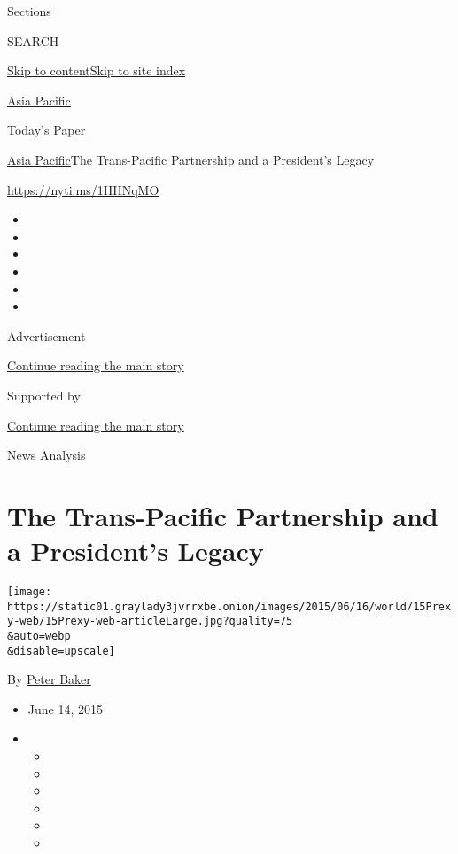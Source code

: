 Sections

SEARCH

\protect\hyperlink{site-content}{Skip to
content}\protect\hyperlink{site-index}{Skip to site index}

\href{https://www.nytimes3xbfgragh.onion/section/world/asia}{Asia
Pacific}

\href{https://myaccount.nytimes3xbfgragh.onion/auth/login?response_type=cookie\&client_id=vi}{}

\href{https://www.nytimes3xbfgragh.onion/section/todayspaper}{Today's
Paper}

\href{/section/world/asia}{Asia Pacific}\textbar{}The Trans-Pacific
Partnership and a President's Legacy

\url{https://nyti.ms/1HHNqMO}

\begin{itemize}
\item
\item
\item
\item
\item
\item
\end{itemize}

Advertisement

\protect\hyperlink{after-top}{Continue reading the main story}

Supported by

\protect\hyperlink{after-sponsor}{Continue reading the main story}

News Analysis

\hypertarget{the-trans-pacific-partnership-and-a-presidents-legacy}{%
\section{The Trans-Pacific Partnership and a President's
Legacy}\label{the-trans-pacific-partnership-and-a-presidents-legacy}}

\texttt{[image: https://static01.graylady3jvrrxbe.onion/images/2015/06/16/world/15Prexy-web/15Prexy-web-articleLarge.jpg?quality=75\\\&auto=webp\\\&disable=upscale]}

By \href{http://www.nytimes3xbfgragh.onion/by/peter-baker}{Peter Baker}

\begin{itemize}
\item
  June 14, 2015
\item
  \begin{itemize}
  \item
  \item
  \item
  \item
  \item
  \item
  \end{itemize}
\end{itemize}

